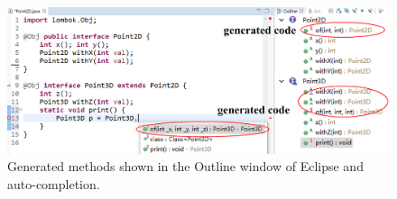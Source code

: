 \begin{figure}[t]
\saveSpaceFig
\saveSpaceFig
\centering
\includegraphics[width=5.2in]{pdfs/screenshot4.png}
\caption{Generated methods shown in the Outline window of Eclipse and auto-completion.}
\label{fig:screenshot}
\saveSpaceFig
\end{figure}

